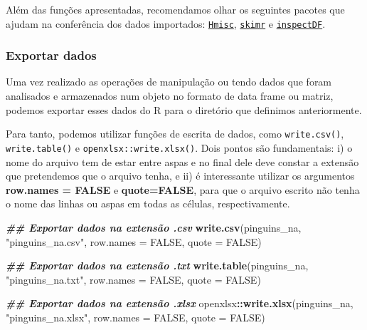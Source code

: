 \documentclass[
]{article}
\newenvironment{Shaded}{\begin{snugshade}}{\end{snugshade}}
\newcommand{\AttributeTok}[1]{\textcolor[rgb]{0.13,0.29,0.53}{#1}}
\newcommand{\ConstantTok}[1]{\textcolor[rgb]{0.56,0.35,0.01}{#1}}
\newcommand{\DocumentationTok}[1]{\textcolor[rgb]{0.56,0.35,0.01}{\textbf{\textit{#1}}}}
\newcommand{\FunctionTok}[1]{\textcolor[rgb]{0.13,0.29,0.53}{\textbf{#1}}}
\newcommand{\NormalTok}[1]{#1}
\newcommand{\SpecialCharTok}[1]{\textcolor[rgb]{0.81,0.36,0.00}{\textbf{#1}}}
\newcommand{\StringTok}[1]{\textcolor[rgb]{0.31,0.60,0.02}{#1}}
\begin{document}
Além das funções apresentadas, recomendamos olhar os seguintes pacotes que ajudam na conferência dos dados importados: \href{https://cran.r-project.org/web/packages/Hmisc/index.html}{\texttt{Hmisc}}, \href{https://cran.r-project.org/web/packages/skimr.html}{\texttt{skimr}} e \href{https://alastairrushworth.github.io/inspectdf}{\texttt{inspectDF}}.

\hypertarget{exportar-dados}{%
\subsubsection{Exportar dados}\label{exportar-dados}}

Uma vez realizado as operações de manipulação ou tendo dados que foram analisados e armazenados num objeto no formato de data frame ou matriz, podemos exportar esses dados do R para o diretório que definimos anteriormente.

Para tanto, podemos utilizar funções de escrita de dados, como \texttt{write.csv()}, \texttt{write.table()} e \texttt{openxlsx::write.xlsx()}. Dois pontos são fundamentais: i) o nome do arquivo tem de estar entre aspas e no final dele deve constar a extensão que pretendemos que o arquivo tenha, e ii) é interessante utilizar os argumentos \textbf{row.names = FALSE} e \textbf{quote=FALSE}, para que o arquivo escrito não tenha o nome das linhas ou aspas em todas as células, respectivamente.

\begin{Shaded}
\begin{Highlighting}[]
\DocumentationTok{\#\# Exportar dados na extensão .csv}
\FunctionTok{write.csv}\NormalTok{(pinguins\_na, }\StringTok{"pinguins\_na.csv"}\NormalTok{, }
          \AttributeTok{row.names =} \ConstantTok{FALSE}\NormalTok{, }\AttributeTok{quote =} \ConstantTok{FALSE}\NormalTok{)}

\DocumentationTok{\#\# Exportar dados na extensão .txt}
\FunctionTok{write.table}\NormalTok{(pinguins\_na, }\StringTok{"pinguins\_na.txt"}\NormalTok{, }
            \AttributeTok{row.names =} \ConstantTok{FALSE}\NormalTok{, }\AttributeTok{quote =} \ConstantTok{FALSE}\NormalTok{)}

\DocumentationTok{\#\# Exportar dados na extensão .xlsx}
\NormalTok{openxlsx}\SpecialCharTok{::}\FunctionTok{write.xlsx}\NormalTok{(pinguins\_na, }\StringTok{"pinguins\_na.xlsx"}\NormalTok{, }
                     \AttributeTok{row.names =} \ConstantTok{FALSE}\NormalTok{, }\AttributeTok{quote =} \ConstantTok{FALSE}\NormalTok{)}
\end{Highlighting}
\end{Shaded}
\end{document}
